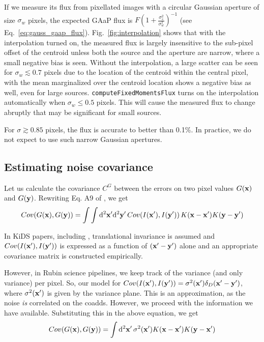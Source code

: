 \documentclass[DM,lsstdraft, authoryear,toc]{lsstdoc}
\newcommand{\rmd}{\mathrm{d}^2}
\begin{document}
If we measure its flux from pixellated images with a circular Gaussian aperture of size $\sigma_w$ pixels, the expected GAaP flux is $F\left(1+\frac{\sigma_s^2}{\sigma_w^2}\right)^{-1}$ (see Eq.~\ref{eq:gauss_gaap_flux}).
Fig.~\ref{fig:interpolation} shows that with the interpolation turned on, the measured flux is largely insensitive to the sub-pixel offset of the centroid unless both the source and the aperture are narrow, where a small negative bias is seen.
Without the interpolation, a large scatter can be seen for $\sigma_w \lesssim 0.7$ pixels due to the location of the centroid within the central pixel, with the mean marginalized over the centroid location shows a negative bias as well, even for large sources.
\texttt{computeFixedMomentsFlux} turns on the interpolation automatically when $\sigma_w \le 0.5$ pixels.
This will cause the measured flux to change abruptly that may be significant for small sources.

For $\sigma \gtrsim 0.85$ pixels, the flux is accurate to better than 0.1\%.
In practice, we do not expect to use such narrow Gaussian apertures.

\subsection{Estimating noise covariance}
Let us calculate the covariance $C^G$ between the errors on two pixel values $G({\bf x})$ and $G({\bf y})$. Rewriting Eq. A9 of \cite{2015MNRAS.454.3500K}, we get
\begin{equation}
  Cov(G({\bf x}), G({\bf y})) = \int\int\rmd{\bf x}'\rmd{\bf y}'\, Cov(I({\bf x}'),I({\bf y}'))\, K({\bf x}-{\bf x}')K({\bf y}-{\bf y}')
\end{equation}

In KiDS papers, including \cite{2015MNRAS.454.3500K}, translational invariance is assumed and $Cov(I({\bf x}'),I({\bf y}'))$ is expressed as a function of $({\bf x}'-{\bf y}')$ alone and an appropriate covariance matrix is constructed empirically.

However, in Rubin science pipelines, we keep track of the variance (and only variance) per pixel.
So, our model for $Cov(I({\bf x}'), I({\bf y}')) = \sigma^2({\bf x}')\delta_D({\bf x'}-{\bf y}')$, where $\sigma^2({\bf x}')$ is given by the variance plane.
This is an approximation, as the noise \emph{is} correlated on the coadds. However, we proceed with the information we have available. Substituting this in the above equation, we get
\begin{equation}
  Cov(G({\bf x}), G({\bf y})) = \int\rmd{\bf x}'\, \sigma^2({\bf x}') K({\bf x}-{\bf x}')K({\bf y}-{\bf x}')
\end{equation}
\end{document}
